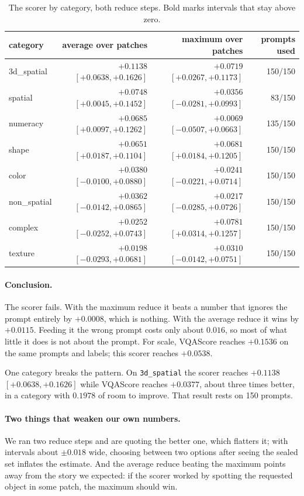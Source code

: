 \documentclass[11pt]{article}
\newcommand{\good}[1]{\textcolor{green!45!black}{#1}}
\begin{document}
\begin{table}[h]
\centering
\caption{The scorer by category, both reduce steps. Bold marks intervals that stay above zero.}
\begin{tabular}{@{}lrrr@{}}
\toprule
category & average over patches & maximum over patches & prompts used \\
\midrule
3d\_spatial  & \good{$\mathbf{+0.1138}$ $[+0.0638,+0.1626]$} & \good{$\mathbf{+0.0719}$ $[+0.0267,+0.1173]$} & 150/150 \\
spatial      & \good{$\mathbf{+0.0748}$ $[+0.0045,+0.1452]$} & $+0.0356$ $[-0.0281,+0.0993]$ & 83/150 \\
numeracy     & \good{$\mathbf{+0.0685}$ $[+0.0097,+0.1262]$} & $+0.0069$ $[-0.0507,+0.0663]$ & 135/150 \\
shape        & \good{$\mathbf{+0.0651}$ $[+0.0187,+0.1104]$} & \good{$\mathbf{+0.0681}$ $[+0.0184,+0.1205]$} & 150/150 \\
color        & $+0.0380$ $[-0.0100,+0.0880]$ & $+0.0241$ $[-0.0221,+0.0714]$ & 150/150 \\
non\_spatial & $+0.0362$ $[-0.0142,+0.0865]$ & $+0.0217$ $[-0.0285,+0.0726]$ & 150/150 \\
complex      & $+0.0252$ $[-0.0252,+0.0743]$ & \good{$\mathbf{+0.0781}$ $[+0.0314,+0.1257]$} & 150/150 \\
texture      & $+0.0198$ $[-0.0293,+0.0681]$ & $+0.0310$ $[-0.0142,+0.0751]$ & 150/150 \\
\bottomrule
\end{tabular}
\end{table}

\paragraph{Conclusion.} The scorer fails. With the maximum reduce it beats a number that ignores the
prompt entirely by $+0.0008$, which is nothing. With the average reduce it wins by $+0.0115$. Feeding
it the wrong prompt costs only about $0.016$, so most of what little it does is not about the prompt.
For scale, VQAScore reaches $+0.1536$ on the same prompts and labels; this scorer reaches $+0.0538$.

One category breaks the pattern. On \texttt{3d\_spatial} the scorer reaches $+0.1138$
$[+0.0638, +0.1626]$ while VQAScore reaches $+0.0377$, about three times better, in a category with
$0.1978$ of room to improve. That result rests on 150 prompts.

\paragraph{Two things that weaken our own numbers.} We ran two reduce steps and are quoting the
better one, which flatters it; with intervals about $\pm 0.018$ wide, choosing between two options
after seeing the sealed set inflates the estimate. And the average reduce beating the maximum points
away from the story we expected: if the scorer worked by spotting the requested object in some patch,
the maximum should win.
\end{document}
